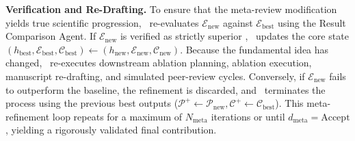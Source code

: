 \noindent\textbf{Verification and Re-Drafting.}
To ensure that the meta-review modification yields true scientific progression, \sname~re-evaluates $\mathcal{E}_{\mathrm{new}}$ against $\mathcal{E}_{\mathrm{best}}$ using the Result Comparison Agent.
If $\mathcal{E}_{\mathrm{new}}$ is verified as strictly superior , \sname~updates the core state $(h_{\mathrm{best}}, \mathcal{E}_{\mathrm{best}}, \mathcal{C}_{\mathrm{best}}) \leftarrow (h_{\mathrm{new}}, \mathcal{E}_{\mathrm{new}}, \mathcal{C}_{\mathrm{new}})$.
Because the fundamental idea has changed, \sname~re-executes downstream ablation planning, ablation execution, manuscript re-drafting, and simulated peer-review cycles.
Conversely, if $\mathcal{E}_{\mathrm{new}}$ fails to outperform the baseline, the refinement is discarded, and \sname~terminates the process using the previous best outputs ($\mathcal{P}^+ \leftarrow \mathcal{P}_{\mathrm{new}}, \mathcal{C}^+ \leftarrow \mathcal{C}_{\mathrm{best}}$).
This meta-refinement loop repeats for a maximum of $N_{\mathrm{meta}}$ iterations or until $d_{\mathrm{meta}} = \mathrm{Accept}$, yielding a rigorously validated final contribution.